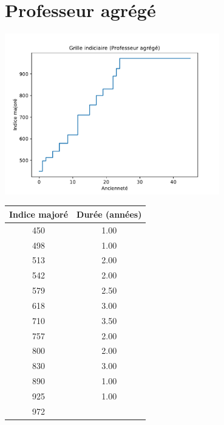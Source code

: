 \newpage 
 
\chapter{Professeur agrégé} 

\begin{minipage}{0.55\linewidth}\includegraphics[width=0.7\textwidth]{fig/grille_ProfAgrege.pdf}\end{minipage} 
\begin{minipage}{0.3\linewidth} 
 \begin{center} 

\begin{tabular}[htb]{|c|c|} 
\hline 
 Indice majoré &  Durée (années) \\ 
\hline \hline 
 450 &  1.00 \\ 
\hline 
 498 &  1.00 \\ 
\hline 
 513 &  2.00 \\ 
\hline 
 542 &  2.00 \\ 
\hline 
 579 &  2.50 \\ 
\hline 
 618 &  3.00 \\ 
\hline 
 710 &  3.50 \\ 
\hline 
 757 &  2.00 \\ 
\hline 
 800 &  2.00 \\ 
\hline 
 830 &  3.00 \\ 
\hline 
 890 &  1.00 \\ 
\hline 
 925 &  1.00 \\ 
\hline 
 972 &   \\ 
\hline 
\hline 
\end{tabular} 
\end{center} 
 \end{minipage} 


 \addto{\captionsenglish}{ \renewcommand{\mtctitle}{}} \setcounter{minitocdepth}{2} 
 \minitoc \newpage 

